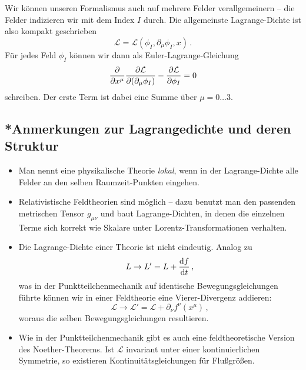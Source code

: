 \documentclass[paper=a4, fontsize=11.0pt, abstractoff, DIV12]{scrartcl}
\newcommand{\LD}{\ensuremath{\mathcal{L}}}
\begin{document}
Wir können unseren Formalismus auch auf mehrere Felder verallgemeinern --
die Felder indizieren wir mit dem Index $I$ durch. Die allgemeinste
Lagrange-Dichte ist also kompakt geschrieben
\begin{equation}
\LD = \LD(\phi_I, \partial_\mu\phi_I, x)\,.
\end{equation}
Für jedes Feld $\phi_I$ können wir dann als Euler-Lagrange-Gleichung
\begin{equation}
\firstpderiv{}{x^\mu}\firstpderiv{\LD}{(\partial_\mu\phi_I)} - \firstpderiv{\LD}{\phi_I} = 0
\end{equation}
schreiben. Der erste Term ist dabei eine Summe über $\mu = 0\dots3$.

\subsection{*Anmerkungen zur Lagrangedichte und deren Struktur}

\begin{itemize}
    \item Man nennt eine physikalische Theorie \emph{lokal}, wenn in der
    Lagrange-Dichte alle Felder an den selben Raumzeit-Punkten eingehen.

    \item Relativistische Feldtheorien sind möglich -- dazu benutzt man den
    passenden metrischen Tensor $g_{\mu\nu}$ und baut Lagrange-Dichten, in
    denen die einzelnen Terme sich korrekt wie Skalare unter
    Lorentz-Transformationen verhalten.

    \item Die Lagrange-Dichte einer Theorie ist nicht eindeutig. Analog zu
    \begin{equation}
    L \to L' = L + \frac{\mathrm{d}f}{\mathrm{d}t}\,,
    \end{equation}
    was in der Punktteilchenmechanik auf identische Bewegungsgleichungen
    führte können wir in einer Feldtheorie eine Vierer-Divergenz addieren:
    \begin{equation}
    \LD \to \LD' = \LD + \partial_\nu f^\nu(x^\mu)\,,
    \end{equation}
    woraus die selben Bewegungsgleichungen resultieren.

    \item Wie in der Punktteilchenmechanik gibt es auch eine
    feldtheoretische Version des Noether-Theorems. Ist $\LD$ invariant unter
    einer kontinuierlichen Symmetrie, so existieren Kontinuitätsgleichungen
    für Flußgrößen.
\end{itemize}
\end{document}
